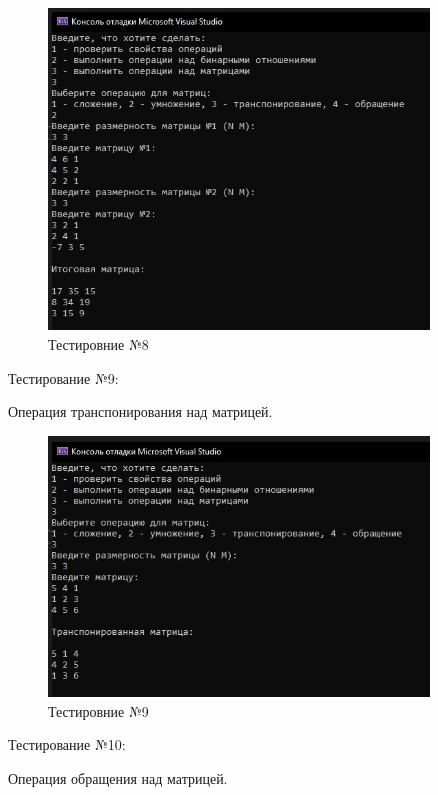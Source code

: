 \documentclass[bachelor, och, labwork]{shiza}
\begin{document}
\begin{figure}[H]
	\centering
	\includegraphics[width=0.9\textwidth]{test_8}
	\caption{Тестировние №8}
	\label{fig:test_8}
\end{figure}

	Тестирование №9:

Операция транспонирования над матрицей.


\begin{figure}[H]
	\centering
	\includegraphics[width=0.9\textwidth]{test_9}
	\caption{Тестировние №9}
	\label{fig:test_9}
\end{figure}

	Тестирование №10:


Операция обращения над матрицей.
\end{document}
